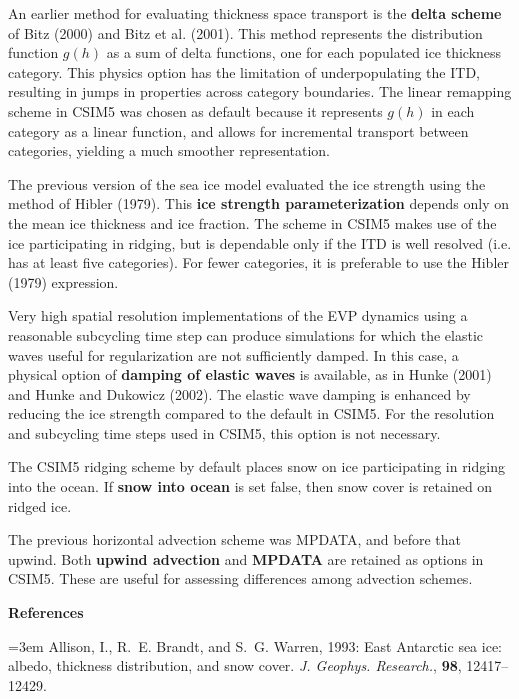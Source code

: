 An earlier method for evaluating thickness space transport is the {\bf delta scheme}
of Bitz (2000) and Bitz et al. (2001). This method represents the distribution function
$g(h)$ as a sum of delta functions, one for each populated ice thickness 
category. This physics option has the limitation of underpopulating the ITD, 
resulting in jumps in properties across category boundaries. The linear remapping
scheme in CSIM5 was chosen as default because it represents $g(h)$ in each category
as a linear function, and allows for incremental transport between categories, yielding
a much smoother representation.

The previous version of the sea ice model evaluated the ice strength using the
method of Hibler (1979). This {\bf ice strength parameterization} depends only
on the mean ice thickness and ice fraction. The scheme in CSIM5 makes use of 
the ice participating in ridging, but is dependable only if the ITD is well 
resolved (i.e. has at least five categories). For fewer categories,
it is preferable to use the Hibler (1979) expression.

Very high spatial resolution implementations of the EVP dynamics using a reasonable 
subcycling time step can produce simulations for which the elastic waves useful for 
regularization are not sufficiently damped. In this case, a physical option of
{\bf damping of elastic waves} is available, as in Hunke (2001) and
Hunke and Dukowicz (2002). The
elastic wave damping is enhanced by reducing the ice strength compared to the
default in CSIM5. For the resolution and subcycling time steps used in CSIM5, 
this option is not necessary.

The CSIM5 ridging scheme by default places snow on ice participating in ridging
into the ocean. If {\bf snow into ocean} is set false, then snow cover is 
retained on ridged ice.

The previous horizontal advection scheme was MPDATA, and before that upwind.
Both {\bf upwind advection} and {\bf MPDATA} are retained as options in CSIM5. 
These are useful for assessing differences among advection schemes.

\vfill\eject

\vskip 10pt
\centerline {\bf References}

\def\refpar{\par\hangindent=3em}
\def\reference{\relax\refpar}

\reference
Allison, I., R.~E. Brandt, and S.~G. Warren, 1993: East Antarctic sea ice:
albedo, thickness distribution, and snow cover. 
  {\it J. Geophys. Research.}, {\bf 98}, 12417--12429.

